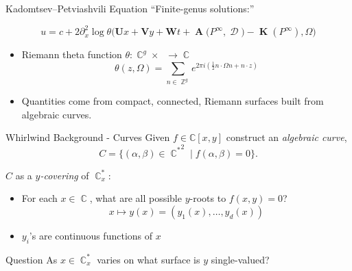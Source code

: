 \documentclass{beamer}
\DeclareMathOperator{\ZZ}{\mathbb{Z}}
\DeclareMathOperator{\CC}{\mathbb{C}}
\DeclareMathOperator{\hg}{\mathfrak{h}_g}
\DeclareMathOperator{\DivD}{\mathcal{D}}
\DeclareMathOperator{\RCV}{\boldsymbol{K}}
\DeclareMathOperator{\Abel}{\boldsymbol{A}}
\begin{document}
\begin{frame}{Kadomtsev--Petviashvili Equation}{}
  ``Finite-genus solutions:''

  \vspace{12pt}

  \[
  u
  =
  c + 2 \partial_x^2 \log \theta\Big( \boldsymbol{U}x +
  \boldsymbol{V}y + \boldsymbol{W}t + \Abel\big(P^\infty,\DivD\big) -
  \RCV(P^\infty), \Omega \Big)
  \]

  \vspace{12pt}

  \pause

  \begin{itemize}[<+->]
  \item Riemann theta function $\theta : \CC^g \times \hg \to \CC$
    \[
    \theta(z,\Omega) = \sum_{n \in \ZZ^g} e^{2 \pi i
      \left(\tfrac{1}{2} n \cdot \Omega n + n \cdot z \right)}
    \]
  \item Quantities come from compact, connected, Riemann surfaces built from
    algebraic curves.
  \end{itemize}
\end{frame}


\begin{frame}{Whirlwind Background - Curves}{}
  Given $f \in \mathbb{C}[x,y]$ construct an {\it algebraic curve},
  \[
  C = \{ (\alpha, \beta) \in {\CC^*}^2 \; | \; f(\alpha, \beta) = 0 \}.
  \]

  \pause

  $C$ as a {\it $y$-covering} of $\CC_x^*$:
  \begin{itemize}[<+->]
    \item For each $x \in \CC$, what are all possible $y$-roots to $f(x,y)=0$?
      \[
          x \mapsto y(x) = (y_1(x), \ldots, y_d(x))
      \]
    \item $y_i$'s are continuous functions of $x$
  \end{itemize}

  \pause

  \begin{block}{Question}
    As $x \in \CC_x^*$ varies on what surface is $y$ single-valued?
  \end{block}
\end{frame}
\end{document}

